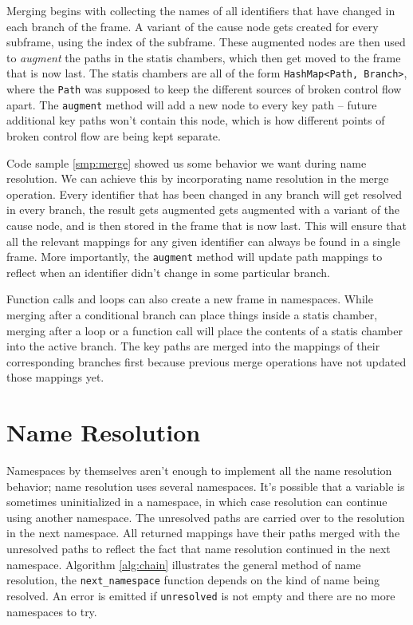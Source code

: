 \documentclass[a4paper, 16pt, oneside]{Thesis}
\begin{document}
Merging begins with collecting the names of all identifiers that have
changed in each branch of the frame. A variant of the cause node gets
created for every subframe, using the index of the subframe. These
augmented nodes are then used to \emph{augment} the paths in the statis
chambers, which then get moved to the frame that is now last. The statis
chambers are all of the form
\texttt{HashMap\textless{}Path,\ Branch\textgreater{}}, where the
\texttt{Path} was supposed to keep the different sources of broken
control flow apart. The \texttt{augment} method will add a new node to
every key path -- future additional key paths won't contain this node,
which is how different points of broken control flow are being kept
separate.

Code sample \ref{smp:merge} showed us some behavior we want during name
resolution. We can achieve this by incorporating name resolution in the
merge operation. Every identifier that has been changed in any branch
will get resolved in every branch, the result gets augmented gets
augmented with a variant of the cause node, and is then stored in the
frame that is now last. This will ensure that all the relevant mappings
for any given identifier can always be found in a single frame. More
importantly, the \texttt{augment} method will update path mappings to
reflect when an identifier didn't change in some particular branch.

Function calls and loops can also create a new frame in namespaces.
While merging after a conditional branch can place things inside a
statis chamber, merging after a loop or a function call will place the
contents of a statis chamber into the active branch. The key paths are
merged into the mappings of their corresponding branches first because
previous merge operations have not updated those mappings yet.

\section{Name Resolution}\label{name-resolution}

Namespaces by themselves aren't enough to implement all the name
resolution behavior; name resolution uses several namespaces. It's
possible that a variable is sometimes uninitialized in a namespace, in
which case resolution can continue using another namespace. The
unresolved paths are carried over to the resolution in the next
namespace. All returned mappings have their paths merged with the
unresolved paths to reflect the fact that name resolution continued in
the next namespace. Algorithm \ref{alg:chain} illustrates the general
method of name resolution, the \texttt{next\_namespace} function depends
on the kind of name being resolved. An error is emitted if
\texttt{unresolved} is not empty and there are no more namespaces to
try.
\end{document}
